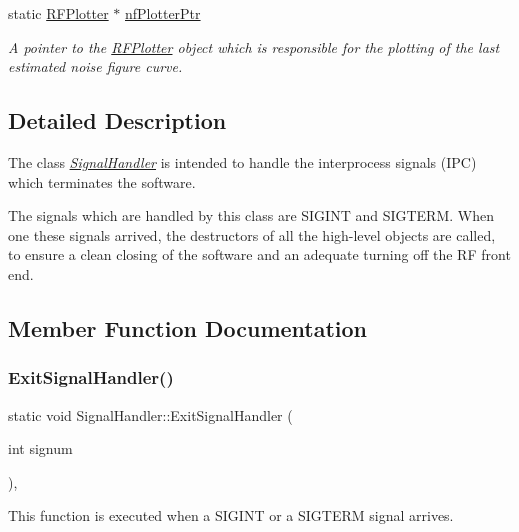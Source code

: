 \begin{DoxyCompactItemize}
static \hyperlink{classRFPlotter}{R\+F\+Plotter} $\ast$ \hyperlink{classSignalHandler_ad5f57e0f7a4ca52357bdd00c358d3a3a}{nf\+Plotter\+Ptr}
\begin{DoxyCompactList}\small\item\em A pointer to the {\itshape \hyperlink{classRFPlotter}{R\+F\+Plotter}} object which is responsible for the plotting of the last estimated noise figure curve. \end{DoxyCompactList}\end{DoxyCompactItemize}


\subsection{Detailed Description}
The class {\itshape \hyperlink{classSignalHandler}{Signal\+Handler}} is intended to handle the interprocess signals (I\+PC) which terminates the software. 

The signals which are handled by this class are S\+I\+G\+I\+NT and S\+I\+G\+T\+E\+RM. When one these signals arrived, the destructors of all the high-\/level objects are called, to ensure a clean closing of the software and an adequate turning off the RF front end. 

\subsection{Member Function Documentation}
\mbox{\label{classSignalHandler_af32b7213b43fd13fa12587a0c0d9b565}} 
\subsubsection{\texorpdfstring{Exit\+Signal\+Handler()}{ExitSignalHandler()}}
{\footnotesize\ttfamily static void Signal\+Handler\+::\+Exit\+Signal\+Handler (\begin{DoxyParamCaption}\item[{int}]{signum }\end{DoxyParamCaption})\hspace{0.3cm}{\ttfamily [inline]}, {\ttfamily [static]}}



This function is executed when a S\+I\+G\+I\+NT or a S\+I\+G\+T\+E\+RM signal arrives. 

